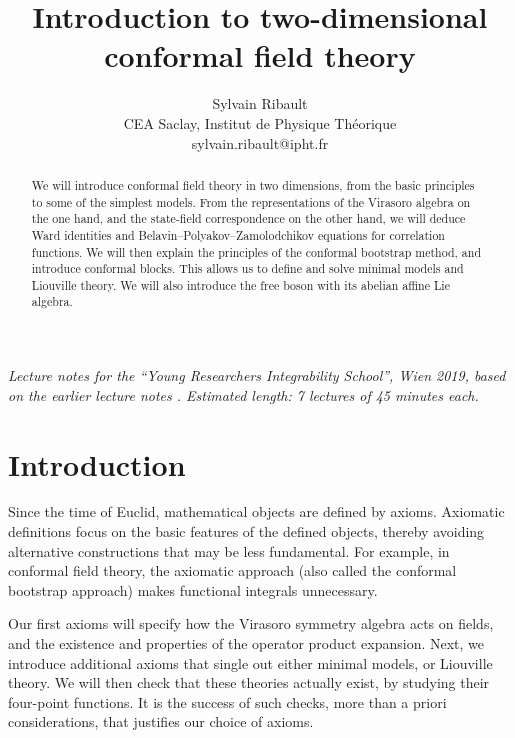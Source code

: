 \documentclass[12pt, a4paper]{article}
\title{\bfseries Introduction to two-dimensional \\ conformal field theory}
\author{Sylvain Ribault \vspace{2mm}
\\
{\normalsize CEA Saclay, Institut de Physique Th\'eorique}
 \\
 {\footnotesize \ttfamily sylvain.ribault@ipht.fr }
}
\theoremstyle{break}
\begin{document}
\maketitle


\begin{abstract}
We will introduce conformal field theory in two dimensions, from the basic principles to some of the simplest models. From the representations of the Virasoro algebra on the one hand, and the state-field correspondence on the other hand, we will deduce Ward identities and Belavin--Polyakov--Zamolodchikov equations for correlation functions. We will then explain the principles of the conformal bootstrap method, and introduce conformal blocks. This allows us to define and solve minimal models and Liouville theory. We will also introduce the free boson with its abelian affine Lie algebra. 
\end{abstract}

\vspace{5mm}

 \textit{Lecture notes for the ``Young Researchers Integrability School'', Wien 2019, based on the earlier lecture notes \cite{rib16}. Estimated length: 7 lectures of 45 minutes each.}



\clearpage

\tableofcontents

\hypersetup{linkcolor=blue}

\setcounter{section}{-1}

\section{Introduction}

Since the time of Euclid, mathematical objects are defined by axioms. 
Axiomatic definitions focus on the basic features of the defined objects, thereby avoiding alternative constructions that may be less fundamental.
For example, in conformal field theory, the axiomatic approach (also called the conformal bootstrap approach) makes functional integrals unnecessary.

Our first axioms will specify how the Virasoro symmetry algebra acts on fields, and the existence and properties of the operator product expansion. 
Next, we introduce additional axioms that single out either minimal models, or Liouville theory.
We will then check that these theories actually exist, by studying their four-point functions.
It is the success of such checks, more than a priori considerations, that justifies our choice of axioms. 
\end{document}
